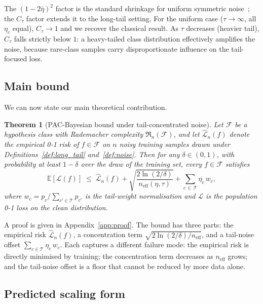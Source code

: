 \documentclass[11pt]{article}
\newtheorem{theorem}{Theorem}
\begin{document}
The $(1 - 2\bar{\eta})^{2}$ factor is the standard shrinkage for uniform symmetric noise~\cite{natarajan2013}; the $C_{\tau}$ factor extends it to the long-tail setting. For the uniform case ($\tau \to \infty$, all $\eta_c$ equal), $C_{\tau} \to 1$ and we recover the classical result. As $\tau$ decreases (heavier tail), $C_{\tau}$ falls strictly below $1$: a heavy-tailed class distribution effectively amplifies the noise, because rare-class samples carry disproportionate influence on the tail-focused loss.

\subsection{Main bound}

We can now state our main theoretical contribution.

\begin{theorem}[PAC-Bayesian bound under tail-concentrated noise]
\label{thm:main}
Let $\mathcal{F}$ be a hypothesis class with Rademacher complexity $\mathfrak{R}_n(\mathcal{F})$, and let $\hat{\mathcal{L}}_n(f)$ denote the empirical 0-1 risk of $f \in \mathcal{F}$ on $n$ noisy training samples drawn under Definitions~\ref{def:long_tail} and~\ref{def:noise}. Then for any $\delta \in (0, 1)$, with probability at least $1 - \delta$ over the draw of the training set, every $f \in \mathcal{F}$ satisfies
\begin{equation}
\mathbb{E}[\mathcal{L}(f)] \;\le\; \hat{\mathcal{L}}_n(f) + \sqrt{\frac{2 \ln(2 / \delta)}{n_{\mathrm{eff}}(\eta, \tau)}} + \sum_{c \, \in \, \mathcal{T}} \eta_c \, w_c, \label{eq:main_bound}
\end{equation}
where $w_c = p_c / \sum_{c' \in \mathcal{T}} p_{c'}$ is the tail-weight normalisation and $\mathcal{L}$ is the population 0-1 loss on the clean distribution.
\end{theorem}

A proof is given in Appendix~\ref{app:proof}. The bound has three parts: the empirical risk $\hat{\mathcal{L}}_n(f)$, a concentration term $\sqrt{2 \ln(2/\delta) / n_{\mathrm{eff}}}$, and a tail-noise offset $\sum_{c \in \mathcal{T}} \eta_c \, w_c$. Each captures a different failure mode: the empirical risk is directly minimised by training; the concentration term decreases as $n_{\mathrm{eff}}$ grows; and the tail-noise offset is a floor that cannot be reduced by more data alone.

\subsection{Predicted scaling form}
\end{document}
